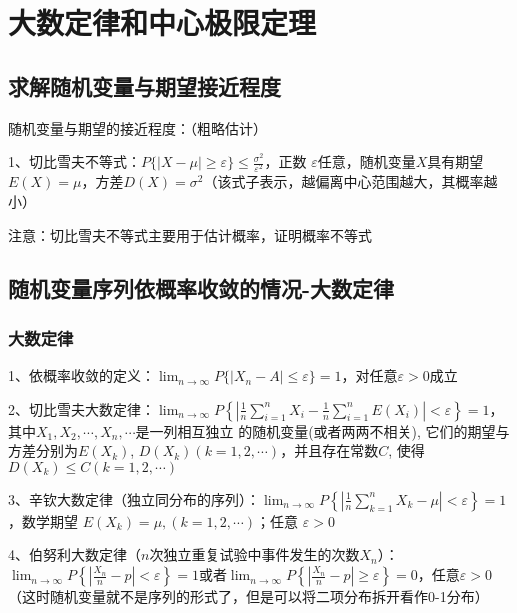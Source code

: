 \chapter{大数定律和中心极限定理}

\section{求解随机变量与期望接近程度}

随机变量与期望的接近程度：（粗略估计）

1、切比雪夫不等式：$P\{|X-\mu| \geqslant \varepsilon\} \leqslant \frac{\sigma^{2}}{\varepsilon^{2}}$，正数 $\varepsilon$任意，随机变量$X$具有期望$E(X)=\mu$，方差$D(X)=\sigma^{2}$（该式子表示，越偏离中心范围越大，其概率越小）

注意：切比雪夫不等式主要用于估计概率，证明概率不等式

\section{随机变量序列依概率收敛的情况-大数定律}



\subsection{大数定律}

1、依概率收敛的定义：$\lim_{n \rightarrow \infty} P\{|X_n-A| \le \varepsilon \}=1$，对任意$\varepsilon > 0$成立

2、切比雪夫大数定律：$\lim_{n \rightarrow \infty} P\left\{\left|\frac{1}{n} \sum_{i=1}^{n} X_{i}-\frac{1}{n} \sum_{i=1}^{n} E\left(X_{i}\right)\right|<\varepsilon\right\}=1$，其中$X_{1}, X_{2}, \cdots, X_{n}, \cdots$是一列相互独立 的随机变量(或者两两不相关), 它们的期望与方差分别为$E\left(X_{k}\right)$, $D\left(X_{k}\right)(k=1,2, \cdots)$，并且存在常数$C$, 使得$D\left(X_{k}\right) \leqslant C(k=1,2, \cdots)$

3、辛钦大数定律（独立同分布的序列）：$\lim_{n \rightarrow \infty} P\left\{\left|\frac{1}{n} \sum_{k=1}^{n} X_{k}-\mu\right|<\varepsilon\right\}=1$，数学期望 $E\left(X_{k}\right)=\mu,(k=1,2, \cdots)$；任意 $\varepsilon>0$

4、伯努利大数定律（$n$次独立重复试验中事件发生的次数$X_n$）：$\lim_{n \rightarrow \infty} P\left\{\left|\frac{X_n}{n}-p\right|<\varepsilon\right\}=1$或者$\lim_{n \rightarrow \infty} P\left\{\left|\frac{X_n}{n}-p\right| \geqslant \varepsilon\right\}=0$，任意$\varepsilon>0$（这时随机变量就不是序列的形式了，但是可以将二项分布拆开看作0-1分布）

